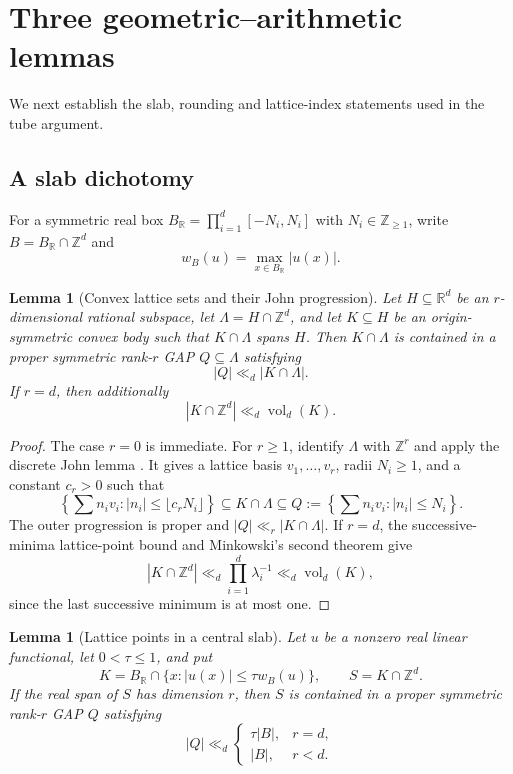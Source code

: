 \documentclass[11pt,reqno]{amsart}
\newtheorem{lemma}[theorem]{Lemma}
\theoremstyle{definition}
\theoremstyle{remark}
\newcommand{\Z}{\mathbb Z}
\newcommand{\R}{\mathbb R}
\newcommand{\vol}{\operatorname{vol}}
\begin{document}
\section{Three geometric--arithmetic lemmas}
\label{sec:three-lemmas}

We next establish the slab, rounding and lattice-index statements used in the tube argument.

\subsection{A slab dichotomy}

For a symmetric real box $B_{\R}=\prod_{i=1}^d[-N_i,N_i]$ with
$N_i\in\Z_{\ge1}$, write $B=B_{\R}\cap\Z^d$ and
\[
 w_B(u)=\max_{x\in B_{\R}}|u(x)|.
\]

\begin{lemma}[Convex lattice sets and their John progression]
\label{lem:convex-lattice-john}
Let $H\subseteq\R^d$ be an $r$-dimensional rational subspace, let
$\Lambda=H\cap\Z^d$, and let $K\subseteq H$ be an origin-symmetric convex
body such that $K\cap\Lambda$ spans $H$.  Then $K\cap\Lambda$ is contained
in a proper symmetric rank-$r$ GAP $Q\subseteq\Lambda$ satisfying
\[
 |Q|\ll_d |K\cap\Lambda|.
\]
If $r=d$, then additionally
\[
 |K\cap\Z^d|\ll_d \vol_d(K).
\]
\end{lemma}

\begin{proof}
The case $r=0$ is immediate.  For $r\ge1$, identify $\Lambda$ with
$\Z^r$ and apply the discrete John lemma \cite[Lemma~7]{PhamZakharov}.
It gives a lattice basis $v_1,\dots,v_r$, radii $N_i\ge1$, and a constant
$c_r>0$ such that
\[
 \left\{\sum n_iv_i:|n_i|\le\lfloor c_rN_i\rfloor\right\}
 \subseteq K\cap\Lambda
 \subseteq Q:=\left\{\sum n_iv_i:|n_i|\le N_i\right\}.
\]
The outer progression is proper and $|Q|\ll_r|K\cap\Lambda|$.  If $r=d$,
the successive-minima lattice-point bound and Minkowski's second theorem give
\[
 |K\cap\Z^d|\ll_d\prod_{i=1}^d\lambda_i^{-1}\ll_d\vol_d(K),
\]
since the last successive minimum is at most one.
\end{proof}

\begin{lemma}[Lattice points in a central slab]
\label{lem:slab-count}
Let $u$ be a nonzero real linear functional, let $0<\tau\le1$, and put
\[
 K=B_{\R}\cap\{x:|u(x)|\le\tau w_B(u)\},
 \qquad
 S=K\cap\Z^d.
\]
If the real span of $S$ has dimension $r$, then $S$ is contained in a
proper symmetric rank-$r$ GAP $Q$ satisfying
\[
 |Q|\ll_d
 \begin{cases}
  \tau|B|,&r=d,\\
  |B|,&r<d.
 \end{cases}
\]
\end{lemma}
\end{document}
